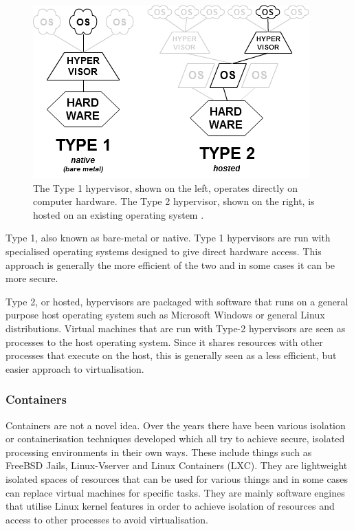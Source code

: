 \begin{figure}[ht!]
\centering
\includegraphics{Figures/hypervisor_difference.png}
\decoRule
\caption[Differences between Type 1 and Type 2 Hypervisors]{The Type 1 hypervisor, shown on the left, operates directly on computer hardware. The Type 2 hypervisor, shown on the right, is hosted on an existing operating system \parencite{Wikipedia_hypervisors}.}
\label{fig:Hypervisors}
\end{figure}

Type 1, also known as bare-metal or native. Type 1 hypervisors are run with specialised operating systems designed to give direct hardware access. This approach is generally the more efficient of the two and in some cases it can be more secure.

Type 2, or hosted, hypervisors are packaged with software that runs on a general purpose host operating system such as Microsoft Windows or general Linux distributions. Virtual machines that are run with Type-2 hypervisors are seen as processes to the host operating system. Since it shares resources with other processes that execute on the host, this is generally seen as a less efficient, but easier approach to virtualisation.

\subsubsection{Containers}

Containers are not a novel idea. Over the years there have been various isolation or containerisation techniques developed which all try to achieve secure, isolated processing environments in their own ways. These include things such as FreeBSD Jails, Linux-Vserver and Linux Containers (LXC). They are lightweight isolated spaces of resources that can be used for various things and in some cases can replace virtual machines for specific tasks. They are mainly software engines that utilise Linux kernel features in order to achieve isolation of resources and access to other processes to avoid virtualisation.


